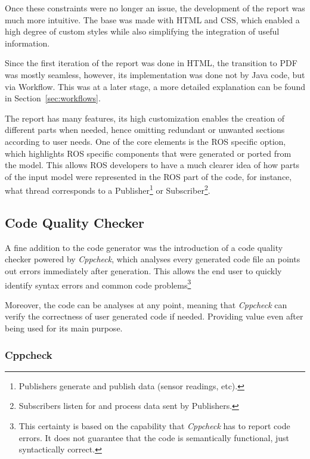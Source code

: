 Once these constraints were no longer an issue, the development of the report was much more intuitive. The base was made with \gls{HTML} and \gls{CSS}, which enabled a high degree of custom styles while also simplifying the integration of useful information. 

Since the first iteration of the report was done in \gls{HTML}, the transition to PDF was mostly seamless, however, its implementation was done not by Java code, but via Workflow. This was at a later stage, a more detailed explanation can be found in Section~\ref{sec:workflows}.

The report has many features, its high customization enables the creation of different parts when needed, hence omitting redundant or unwanted sections according to user needs. One of the core elements is the \gls{ROS} specific option, which highlights \gls{ROS} specific components that were generated or ported from the model. This allows \gls{ROS} developers to have a much clearer idea of how parts of the input model were represented in the \gls{ROS} part of the code, for instance, what thread corresponds to a Publisher\footnote{Publishers generate and publish data (sensor readings, etc).} or Subscriber\footnote{Subscribers listen for and process data sent by Publishers.}.

\subsection{Code Quality Checker}
\label{sec:impl_code_qual_checker}

A fine addition to the code generator was the introduction of a code quality checker powered by \textit{Cppcheck}, which analyses every generated code file an points out errors immediately after generation. This allows the end user to quickly identify syntax errors and common code problems\footnote{This certainty is based on the capability that \textit{Cppcheck} has to report code errors. It does not guarantee that the code is semantically functional, just syntactically correct.}

Moreover, the code can be analyses at any point, meaning that \textit{Cppcheck} can verify the correctness of user generated code if needed. Providing value even after being used for its main purpose.

\subsubsection{Cppcheck}
\label{sec:impl_side_cppchecker}

